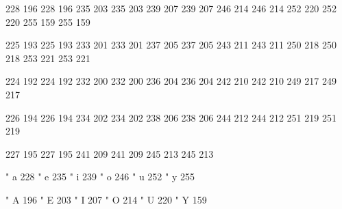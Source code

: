 

\startmapping[texnansi] 

 228 196  228 196  
 235 203  235 203
 239 207  239 207
 246 214  246 214
 252 220  252 220
 255 159  255 159

 225 193  225 193
 233 201  233 201
 237 205  237 205
 243 211  243 211
 250 218  250 218
 253 221  253 221

 224 192  224 192
 232 200  232 200
 236 204  236 204
 242 210  242 210
 249 217  249 217

 226 194  226 194
 234 202  234 202
 238 206  238 206
 244 212  244 212
 251 219  251 219

 227 195  227 195
 241 209  241 209
 245 213  245 213

\stopmapping

\startencoding[texnansi]

 " a 228      
 " e 235      
 " i 239
 " o 246
 " u 252
 " y 255

 " A 196      
 " E 203
 " I 207
 " O 214
 " U 220
 " Y 159

